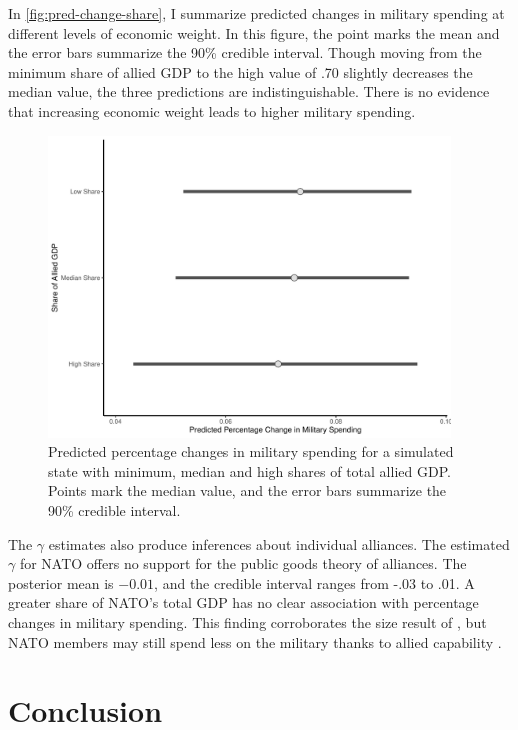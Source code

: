 \documentclass[12pt]{article}
\begin{document}
In \autoref{fig:pred-change-share}, I summarize predicted changes in military spending at different levels of economic weight. 
In this figure, the point marks the mean and the error bars summarize the 90\% credible interval. 
Though moving from the minimum share of allied GDP to the high value of .70 slightly decreases the median value, the three predictions are indistinguishable. 
There is no evidence that increasing economic weight leads to higher military spending. 

\begin{figure}[htbp]
	\centering
		\includegraphics[width=0.95\textwidth]{pred-change-share.pdf}
	\caption{Predicted percentage changes in military spending for a simulated state with minimum, median and high shares of total allied GDP. Points mark the median value, and the error bars summarize the 90\% credible interval.}
	\label{fig:pred-change-share}
\end{figure}


The $\gamma$ estimates also produce inferences about individual alliances.
The estimated $\gamma$ for NATO offers no support for the public goods theory of alliances. 
The posterior mean is $-0.01$, and the credible interval ranges from -.03 to .01.  
A greater share of NATO's total GDP has no clear association with percentage changes in military spending. 
This finding corroborates the size result of \citet{PluemperNeumayer2015}, but NATO members may still spend less on the military thanks to allied capability \citep{GeorgeSandler2017}.


\section{Conclusion}
\end{document}
